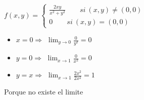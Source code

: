 \documentclass[../practica_03.tex]{subfiles}
\begin{document}
    $f(x,y) = \left\{
        \begin{array}{ll}
            \frac{2xy}{x^2 +y^2} \qquad si\ (x,y)\neq(0,0)\\
            0 \qquad si\ (x,y) = (0,0)
        \end{array}
    \right.$

    \begin{itemize}
        \item $x = 0 \Rightarrow$
            $ \lim_{y \to 0} \frac{0}{y^2} = 0$
        \item $y = 0 \Rightarrow$
            $ \lim_{x \to 1} \frac{0}{x^2} = 0$
        \item $y = x \Rightarrow$
            $ \lim_{x \to 1} \frac{2x^2}{2x^2} = 1$
    \end{itemize}

    Porque no existe el limite
\end{document}
